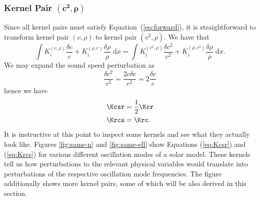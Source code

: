 \subsubsection*{Kernel Pair \texorpdfstring{$\mathbf{(c^2, \rho)}$}{(c2,rho)}}
\noindent
Since all kernel pairs must satisfy Equation~(\ref{eq:forward}), it is straightforward to transform kernel pair ${(c, \rho)}$ to kernel pair ${(c^2, \rho)}$. 
We have that
\begin{equation}
    \int K^{(c,\rho)}_i \frac{\delta c}{c} + K^{(\rho,c)}_i \frac{\delta \rho}{\rho} \; \text{d}x
    =
    \int K^{(c^2,\rho)}_i \frac{\delta c^2}{c^2} + K^{(\rho,c^2)}_i \frac{\delta \rho}{\rho} \; \text{d}x.
\end{equation}
We may expand the sound speed perturbation as
\begin{equation}
    \frac{\delta c^2}{c^2} = \frac{2 c\delta c}{c^2} = 2 \frac{\delta c}{c}
\end{equation}
hence we have
\begin{align}
    \Kcsr &= \frac{1}{2} \Kcr \label{eq:Kcsr}
\\  \Krcs &= \Krc. \label{eq:Krcs}
\end{align}
It is instructive at this point to inspect some kernels and see what they actually look like. Figures \ref{fig:same-n} and \ref{fig:same-ell} show Equations (\ref{eq:Kcsr}) and (\ref{eq:Krcs}) for various different oscillation modes of a solar model. 
These kernels tell us how perturbations to the relevant physical variables would translate into perturbations of the respective oscillation mode frequencies. 
The figure additionally shows more kernel pairs, some of which will be also derived in this section. 

